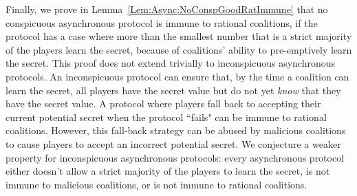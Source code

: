 \documentclass[12pt]{dalcsthesis}
\begin{document}
Finally, we prove in Lemma~\ref{Lem:Async:NoConspGoodRatImmune} that no conspicuous asynchronous protocol is immune to rational coalitions, if the protocol has a case where more than the smallest number that is a strict majority of the players learn the secret, because of coalitions' ability to pre-emptively learn the secret. This proof does not extend trivially to inconspicuous asynchronous protocols. An inconspicuous protocol can ensure that, by the time a coalition can learn the secret, all players have the secret value but do not yet \emph{know} that they have the secret value. A protocol where players fall back to accepting their current potential secret when the protocol ``fails" can be immune to rational coalitions. However, this fall-back strategy can be abused by malicious coalitions to cause players to accept an incorrect potential secret. We conjecture a weaker property for inconspicuous asynchronous protocols: every asynchronous protocol either doesn't allow a strict majority of the players to learn the secret, is not immune to malicious coalitions, or is not immune to rational coalitions.
\end{document}

